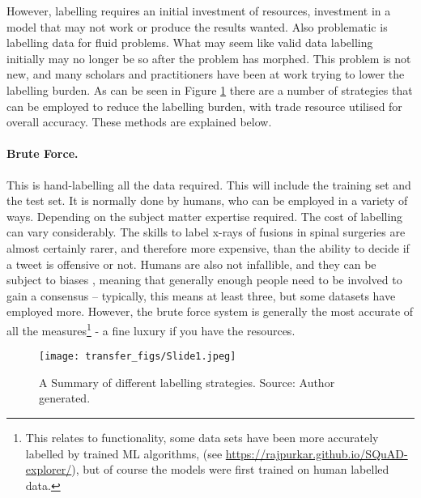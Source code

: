 However, labelling requires an initial investment of resources, investment in a model that may not work or produce the results wanted. Also problematic is labelling data for fluid problems. What may seem like valid data labelling initially may no longer be so after the problem has morphed. This problem is not new, and many scholars and practitioners have been at work trying to lower the labelling burden. As can be seen in Figure \ref{fig:label} there are a number of strategies that can be employed to reduce the labelling burden, with trade resource utilised for overall accuracy. These methods are explained below.



\paragraph{Brute Force.} This is hand-labelling all the data required. This will include the training set and the test set. It is normally done by humans, who can be employed in a variety of ways. Depending on the subject matter expertise required. The cost of labelling can vary considerably. The skills to label x-rays of fusions in spinal surgeries are almost certainly rarer, and therefore more expensive, than the ability to decide if a tweet is offensive or not. Humans are also not infallible, and they can be subject to biases  \parencite{kahneman2011thinking}, meaning that generally enough people need to be involved to gain a consensus – typically, this means at least three, but some datasets have employed more. However, the brute force system is generally the most accurate of all the measures\footnote{This relates to  functionality, some data sets have been more accurately labelled by trained ML algorithms, (see \url{https://rajpurkar.github.io/SQuAD-explorer/}), but of course the models were first trained on human labelled data.}  - a fine luxury if you have the resources.

\begin{figure}
  \texttt{[image: transfer\_figs/Slide1.jpeg]}
  \caption{A Summary of different labelling strategies. Source: Author generated.}
  \label{fig:label}
\end{figure}






